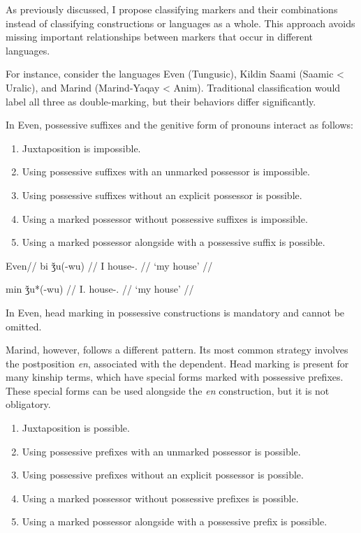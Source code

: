 As previously discussed, I propose classifying markers and their combinations instead of classifying constructions or languages as a whole. This approach avoids missing important relationships between markers that occur in different languages.

For instance, consider the languages Even (Tungusic), Kildin Saami (Saamic < Uralic), and Marind (Marind-Yaqay < Anim). Traditional classification would label all three as double-marking, but their behaviors differ significantly.

In Even, possessive suffixes and the genitive form of pronouns interact as follows:

\begin{enumerate}
	\item Juxtaposition is impossible.
	\item Using possessive suffixes with an unmarked possessor is impossible.
	\item Using possessive suffixes without an explicit possessor is possible.
	\item Using a marked possessor without possessive suffixes is impossible.
	\item Using a marked possessor alongside with a possessive suffix is possible.
\end{enumerate}

\pex
\glpreamble Even//
\a
\begingl
\gla\ljudge{*}bi ǯu(-wu) //
\glb I house-\Poss.\Fsg{} //
\glft `my house' //
\endgl

\a
\begingl
\gla min ǯu*(-wu) //
\glb I.\Obl{} house-\Poss.\Fsg{} //
\glft `my house' //
\endgl
\xe

In Even, head marking in possessive constructions is mandatory and cannot be omitted.

Marind, however, follows a different pattern. Its most common strategy involves the postposition \textit{en}, associated with the dependent. Head marking is present for many kinship terms, which have special forms marked with possessive prefixes. These special forms can be used alongside the \textit{en} construction, but it is not obligatory.

\begin{enumerate}
	\item Juxtaposition is possible.
	\item Using possessive prefixes with an unmarked possessor is possible.
	\item Using possessive prefixes without an explicit possessor is possible.
	\item Using a marked possessor without possessive prefixes is possible.
	\item Using a marked possessor alongside with a possessive prefix is possible.
\end{enumerate}

